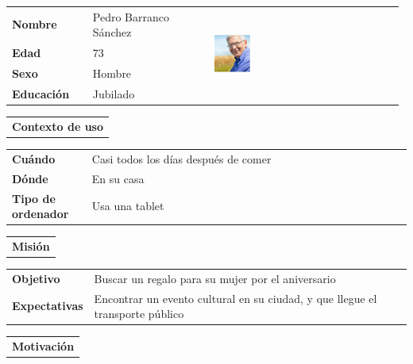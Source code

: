 \documentclass[11pt]{article}
\begin{document}
\begin{table}[H]
  \centering
  \begin{tabular}{p{0.2\linewidth}|p{0.3\linewidth}p{0.475\linewidth}}
    \toprule
    \textbf{Nombre} & Pedro Barranco Sánchez &\multirow{4}{*}{\begin{minipage}{1.\textwidth}\includegraphics[width=0.2\textwidth, height=30mm]{Pedro}\end{minipage}}\\
    \textbf{Edad} & 73 & \\
    \textbf{Sexo} & Hombre & \\
    \textbf{Educación} & Jubilado & \\
    \bottomrule
  \end{tabular}

  \begin{tabular}{l}
    \textbf{Contexto de uso} 
  \end{tabular}
  
  \begin{tabular}{p{0.2\linewidth}|p{0.8\linewidth}}
    \toprule
    \textbf{Cuándo} & Casi todos los días después de comer\\
    \textbf{Dónde}  & En su casa\\
    \textbf{Tipo de ordenador} & Usa una tablet\\
    \bottomrule
  \end{tabular}

  \begin{tabular}{l}
    \textbf{Misión} 
  \end{tabular}
  
  \begin{tabular}{p{0.2\linewidth}|p{0.8\linewidth}}
    \toprule
    \textbf{Objetivo} & Buscar un regalo para su mujer por el aniversario\\
    \textbf{Expectativas}  & Encontrar un evento cultural en su ciudad, y que llegue el transporte público \\
    \bottomrule
  \end{tabular}

  \begin{tabular}{l}
    \textbf{Motivación} 
  \end{tabular}


\end{table}
\end{document}
